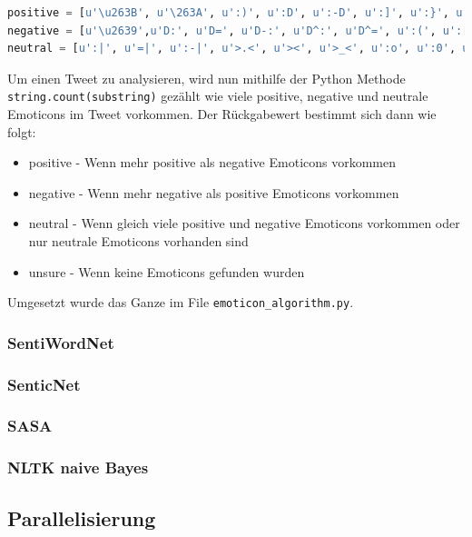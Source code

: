 \begin{lstlisting}[language=Python, caption={Emoticon Arrays}, label={lst:emoticonlisting}]
positive = [u'\u263B', u'\263A', u':)', u':D', u':-D', u':]', u':}', u':o)', u':o]', u':o}', u':-]', u':-)', u':-}', u'=)', u'=]', u'=}', u'=^]', u'=^)', u'=^}', u':B', u':-D', u':-B', u':^D', u':^B', u'=B', u'=^B', u'=^D', u':\'), u':\']', u':\'}', u'<3', u'^.^', u'^-^', u'^_^', u'^^', u':*', u'=*', u':-*', u';)', u';]', u';}', u':-p', u':-P', u':-b', u':^p', u':^P', u':^b', u'=P', u'=p', u'/o/', u':P', u':p', u':b', u'=b', u'=^p', u'=^P', u'=^b', u'\o/']
negative = [u'\u2639',u'D:', u'D=', u'D-:', u'D^:', u'D^=', u':(', u':[', u':{', u':o(', u':o[', u':^(', u':^[', u':^{', u'=^(', u'=^{', u'>=(', u'>=[', u'>={', u'>=(', u'>:-{', u'>:-[', u'>:-(', u'>=^[', u'>:-(', u':-[', u':-(', u'=(', u'=[', u'={', u'=^[', u'>:-=(', u'>=[', u'>=^(', u'=\\', u':\\', u'=/', u'=$', u'o.O', u'O_o', u'Oo', u':$:-{', u'>:-{', u'>=^{', u':o{']
neutral = [u':|', u'=|', u':-|', u'>.<', u'><', u'>_<', u':o', u':0', u'=O', u':@', u'=@', u':^o', u':^@', u'-.-', u'-_-', u':x', u'=X', u':-x', u':-@', u':-#', u':^x']
\end{lstlisting}

Um einen Tweet zu analysieren, wird nun mithilfe der Python Methode \lstinline$string.count(substring)$ gezählt wie viele positive, negative und neutrale Emoticons im Tweet vorkommen. Der Rückgabewert bestimmt sich dann wie folgt:

\begin{itemize}
	\item positive - Wenn mehr positive als negative Emoticons vorkommen
	\item negative - Wenn mehr negative als positive Emoticons vorkommen
	\item neutral - Wenn gleich viele positive und negative Emoticons vorkommen oder nur neutrale Emoticons vorhanden sind
	\item unsure - Wenn keine Emoticons gefunden wurden
\end{itemize} 

Umgesetzt wurde das Ganze im File \lstinline$emoticon_algorithm.py$.

\subsubsection{SentiWordNet}

\subsubsection{SenticNet}

\subsubsection{SASA}

\subsubsection{NLTK naive Bayes}

\subsection{Parallelisierung}